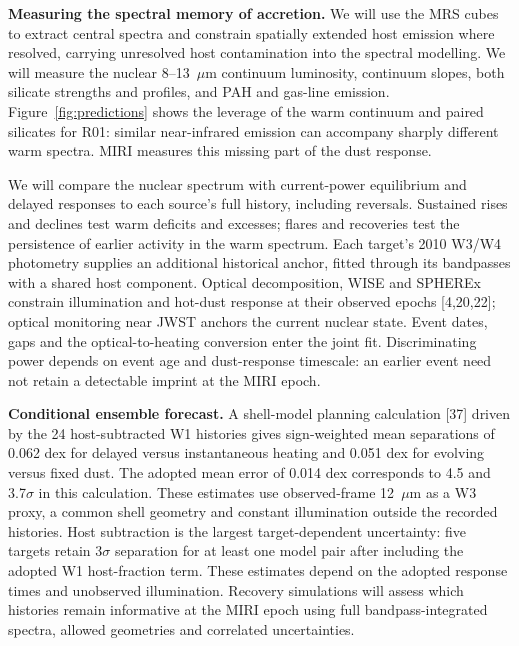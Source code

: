 \documentclass[12pt]{article}
\begin{document}
\clearpage
\noindent\textbf{Measuring the spectral memory of accretion.}
We will use the MRS cubes to extract central spectra and constrain spatially extended host emission where resolved, carrying unresolved host contamination into the spectral modelling. We will measure the nuclear 8--13~$\mu$m continuum luminosity, continuum slopes, both silicate strengths and profiles, and PAH and gas-line emission. Figure~\ref{fig:predictions} shows the leverage of the warm continuum and paired silicates for R01: similar near-infrared emission can accompany sharply different warm spectra. MIRI measures this missing part of the dust response.

We will compare the nuclear spectrum with current-power equilibrium and delayed responses to each source's full history, including reversals. Sustained rises and declines test warm deficits and excesses; flares and recoveries test the persistence of earlier activity in the warm spectrum. Each target's 2010 W3/W4 photometry supplies an additional historical anchor, fitted through its bandpasses with a shared host component. Optical decomposition, WISE and SPHEREx constrain illumination and hot-dust response at their observed epochs [4,20,22]; optical monitoring near JWST anchors the current nuclear state. Event dates, gaps and the optical-to-heating conversion enter the joint fit. Discriminating power depends on event age and dust-response timescale: an earlier event need not retain a detectable imprint at the MIRI epoch.

\noindent\textbf{Conditional ensemble forecast.} A shell-model planning calculation [37] driven by the 24 host-subtracted W1 histories gives sign-weighted mean separations of 0.062 dex for delayed versus instantaneous heating and 0.051 dex for evolving versus fixed dust. The adopted mean error of 0.014 dex corresponds to 4.5 and 3.7$\sigma$ in this calculation. These estimates use observed-frame 12~$\mu$m as a W3 proxy, a common shell geometry and constant illumination outside the recorded histories. Host subtraction is the largest target-dependent uncertainty: five targets retain $3\sigma$ separation for at least one model pair after including the adopted W1 host-fraction term. These estimates depend on the adopted response times and unobserved illumination. Recovery simulations will assess which histories remain informative at the MIRI epoch using full bandpass-integrated spectra, allowed geometries and correlated uncertainties.
\end{document}
